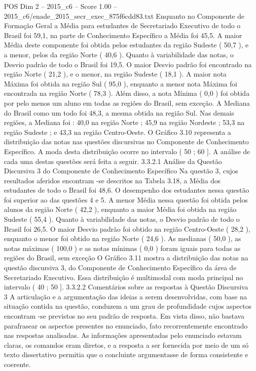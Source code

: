 \begin{textsample}{POS Dim 2 – 2015\_c6 – Score 1.00 – 2015\_c6/enade\_2015\_secr\_exec\_875f6cdd83.txt}
Enquanto no Componente de Formação Geral a Média para estudantes de Secretariado Executivo de todo o Brasil foi 59,1, na parte de Conhecimento Específico a Média foi 45,5.
A maior Média deste componente foi obtida pelos estudantes da região Sudeste ( 50,7 ), e a menor, pelos da região Norte ( 40,6 ).
Quanto à variabilidade das notas, o Desvio padrão de todo o Brasil foi 19,5.
O maior Desvio padrão foi encontrado na região Norte ( 21,2 ), e o menor, na região Sudeste ( 18,1 ).
A maior nota Máxima foi obtida na região Sul ( 95,0 ), enquanto a menor nota Máxima foi encontrada na região Norte ( 78,3 ).
Além disso, a nota Mínima ( 0,0 ) foi obtida por pelo menos um aluno em todas as regiões do Brasil, sem exceção.
A Mediana do Brasil como um todo foi 48,3, a mesma obtida na região Sul.
Nas demais regiões, a Mediana foi : 40,0 na região Norte ; 45,9 na região Nordeste ; 53,3 na região Sudeste ; e 43,3 na região Centro-Oeste.
O Gráfico 3.10 representa a distribuição das notas nas questões discursivas no Componente de Conhecimento Específico.
A moda desta distribuição ocorre no intervalo ( 50 ; 60 ].
A análise de cada uma destas questões será feita a seguir. 3.3.2.1 Análise da Questão Discursiva 3 do Componente de Conhecimento Específico Na questão 3, cujos resultados aferidos encontram -se descritos na Tabela 3.18, a Média dos estudantes de todo o Brasil foi 48,6.
O desempenho dos estudantes nessa questão foi superior ao das questões 4 e 5.
A menor Média nessa questão foi obtida pelos alunos da região Norte ( 42,2 ), enquanto a maior Média foi obtida na região Sudeste ( 55,4 ).
Quanto à variabilidade das notas, o Desvio padrão de todo o Brasil foi 26,5.
O maior Desvio padrão foi obtido na região Centro-Oeste ( 28,2 ), enquanto o menor foi obtido na região Norte ( 24,6 ).
As medianas ( 50,0 ), as notas máximas ( 100,0 ) e as notas mínimas ( 0,0 ) foram iguais para todas as regiões do Brasil, sem exceção O Gráfico 3.11 mostra a distribuição das notas na questão discursiva 3, do Componente de Conhecimento Específico da área de Secretariado Executivo.
Essa distribuição é multimodal com moda principal no intervalo ( 40 ; 50 ]. 3.3.2.2 Comentários sobre as respostas à Questão Discursiva 3 A articulação e a argumentação das ideias a serem desenvolvidas, com base na situação contida na questão, conduzem a um grau de profundidade cujos aspectos encontram -se previstos no seu padrão de resposta.
Em vista disso, não bastava parafrasear os aspectos presentes no enunciado, fato recorrentemente encontrado nas respostas analisadas.
As informações apresentadas pelo enunciado estavam claras, os comandos eram diretos, e a resposta a ser fornecida por meio de um só texto dissertativo permitia que o concluinte argumentasse de forma consistente e coerente.

\end{textsample}
